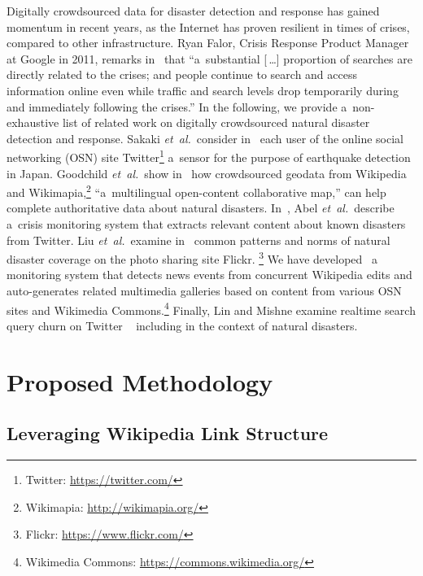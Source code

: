 \documentclass[letterpaper]{article}
\begin{document}
Digitally crowdsourced data for disaster detection and response
has gained momentum in recent years,
as the Internet has proven resilient in times of crises,
compared to other infrastructure.
Ryan Falor, Crisis Response Product Manager at Google in 2011,
remarks in~\cite{falor2011googleorg} that
``a~substantial \textup{[\,\dots]} proportion of searches
are directly related to the crises;
and people continue to search and access information online
even while traffic and search levels drop temporarily
during and immediately following the crises.''
In the following, we provide a~non-exhaustive list of related work
on digitally crowdsourced natural disaster detection and response.
Sakaki \emph{et~al.}\ consider in~\cite{sakaki2010earthquake} each user
of the online social networking (OSN) site
Twitter\footnote{Twitter: \url{https://twitter.com/}} a~sensor
for the purpose of earthquake detection in Japan.
Goodchild \emph{et~al.}\ show in~\cite{goodchild2010crowdsourcing}
how crowdsourced geodata from Wikipedia and
Wikimapia,\footnote{Wikimapia: \url{http://wikimapia.org/}}
``a~multilingual open-content collaborative map,''
can help complete authoritative data about natural disasters.
In~\cite{abel2012twitcident}, Abel \emph{et~al.}\ describe
a~crisis monitoring system that extracts relevant content
about known disasters from Twitter.
Liu \emph{et~al.}\ examine in~\cite{liu2008search}
common patterns and norms of natural disaster coverage
on the photo sharing site Flickr.%
\footnote{Flickr: \url{https://www.flickr.com/}}
We have developed~\cite{steiner2014thesis} a~ monitoring system
that detects news events from concurrent Wikipedia edits
and auto-generates related multimedia galleries
based on content from various OSN sites
and Wikimedia Commons.\footnote{Wikimedia Commons: \url{https://commons.wikimedia.org/}}
Finally, Lin and Mishne examine realtime search query churn on Twitter%
~\cite{lin2012churn} including in the context of natural disasters.

\section{Proposed Methodology}

\subsection{Leveraging Wikipedia Link Structure}
\end{document}

